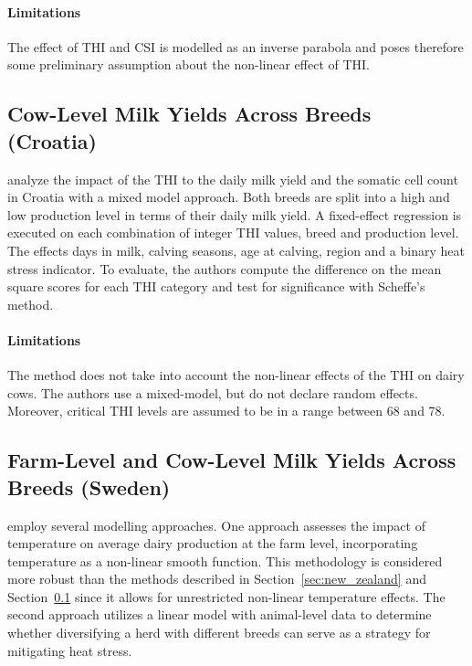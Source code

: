 \paragraph*{Limitations} The effect of THI and CSI is modelled as an inverse parabola and poses therefore some preliminary assumption about the non-linear effect of THI. 


\subsection{Cow-Level Milk Yields Across Breeds (Croatia)}\label{sec:croatia}
\cite{gantner_differences_2017} analyze the impact of the THI to the daily milk yield and the somatic cell count in Croatia with a mixed model approach. Both breeds are split into a high and low production level in terms of their daily milk yield. A fixed-effect regression is executed on each combination of integer THI values, breed and production level. The effects days in milk, calving seasons, age at calving, region and a binary heat stress indicator. To evaluate, the authors compute the difference on the mean square scores for each THI category and test for significance with Scheffe's method.
\paragraph*{Limitations} The method does not take into account the non-linear effects of the THI on dairy cows. The authors use a mixed-model, but do not declare random effects. Moreover, critical THI levels are assumed to be in a range between 68 and 78.

\subsection{Farm-Level and Cow-Level Milk Yields Across Breeds (Sweden)}\label{sec:sweden}
\cite{ahmed_temperature_2022} employ several modelling approaches. One approach assesses the impact of temperature on average dairy production at the farm level, incorporating temperature as a non-linear smooth function. This methodology is considered more robust than the methods described in Section~\ref{sec:new_zealand} and Section~\ref{sec:croatia} since it allows for unrestricted non-linear temperature effects. The second approach utilizes a linear model with animal-level data to determine whether diversifying a herd with different breeds can serve as a strategy for mitigating heat stress.

